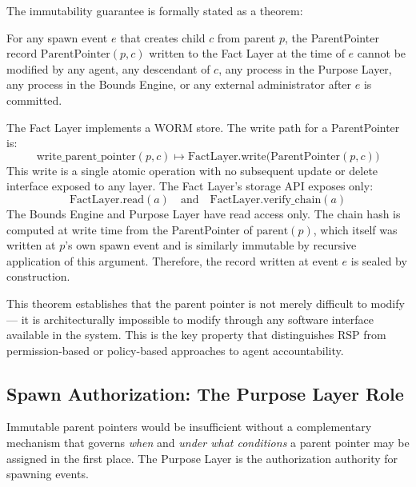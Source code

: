 The immutability guarantee is formally stated as a theorem:

\begin{theorem}
\label{thrm:immutability}
For any spawn event $e$ that creates child $c$ from parent $p$, the ParentPointer record $\mathrm{ParentPointer}(p, c)$ written to the Fact Layer at the time of $e$ cannot be modified by any agent, any descendant of $c$, any process in the Purpose Layer, any process in the Bounds Engine, or any external administrator after $e$ is committed.

\beginproof
The Fact Layer implements a WORM store. The write path for a ParentPointer is:
\[
\mathrm{write\_parent\_pointer}(p, c) \mapsto \mathrm{FactLayer.write}\bigl(\mathrm{ParentPointer}(p, c)\bigr)
\]
This write is a single atomic operation with no subsequent update or delete interface exposed to any layer. The Fact Layer's storage API exposes only:
\[
\mathrm{FactLayer.read}(a) \quad\text{and}\quad \mathrm{FactLayer.verify\_chain}(a)
\]
The Bounds Engine and Purpose Layer have read access only. The chain hash is computed at write time from the ParentPointer of $\mathrm{parent}(p)$, which itself was written at $p$'s own spawn event and is similarly immutable by recursive application of this argument. Therefore, the record written at event $e$ is sealed by construction.
\endproof
\end{theorem}

This theorem establishes that the parent pointer is not merely difficult to modify --- it is architecturally impossible to modify through any software interface available in the system. This is the key property that distinguishes RSP from permission-based or policy-based approaches to agent accountability.

\subsection{Spawn Authorization: The Purpose Layer Role}

Immutable parent pointers would be insufficient without a complementary mechanism that governs \textit{when} and \textit{under what conditions} a parent pointer may be assigned in the first place. The Purpose Layer is the authorization authority for spawning events.

